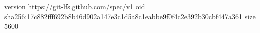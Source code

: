 version https://git-lfs.github.com/spec/v1
oid sha256:17c882fff692b8b46d902a147e3c1d5a8c1eabbe9f0f4c2e392b30cbf447a361
size 5600
